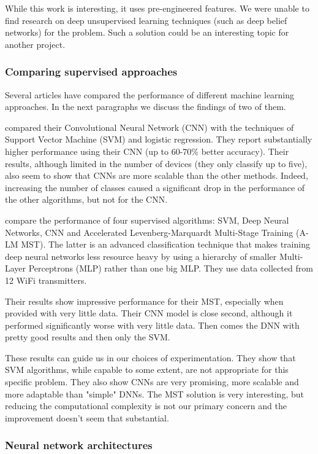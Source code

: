 While this work is interesting, it uses pre-engineered features. We were unable to find research on deep unsupervised learning techniques (such as deep belief networks) for the problem. Such a solution could be an interesting topic for another project.

\subsubsection{Comparing supervised approaches}

Several articles have compared the performance of different machine learning approaches. In the next paragraphs we discuss the findings of two of them.

\textcite{riyaz_deep_2018} compared their Convolutional Neural Network (CNN) with the techniques of Support Vector Machine (SVM) and logistic regression. They report substantially higher performance using their CNN (up to 60-70\% better accuracy). Their results, although limited in the number of devices (they only classify up to five), also seem to show that CNNs are more scalable than the other methods. Indeed, increasing the number of classes caused a significant drop in the performance of the other algorithms, but not for the CNN.

\textcite{youssef_machine_2017} compare the performance of four supervised algorithms: SVM, Deep Neural Networks, CNN and Accelerated Levenberg-Marquardt Multi-Stage Training (A-LM MST). The latter is an advanced classification technique that makes training deep neural networks less resource heavy by using a hierarchy of smaller Multi-Layer Perceptrons (MLP) rather than one big MLP. They use data collected from 12 WiFi transmitters.

Their results show impressive performance for their MST, especially when provided with very little data. Their CNN model is close second, although it performed significantly worse with very little data. Then comes the DNN with pretty good results and then only the SVM.

These results can guide us in our choices of experimentation. They show that SVM algorithms, while capable to some extent, are not appropriate for this specific problem. They also show CNNs are very promising, more scalable and more adaptable than "simple" DNNs. The MST solution is very interesting, but reducing the computational complexity is not our primary concern and the improvement doesn't seem that substantial.

\subsubsection{Neural network architectures} \label{nn-architecture}

